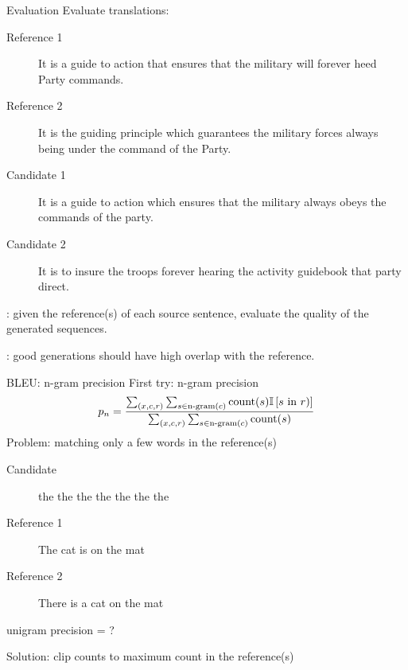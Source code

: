 \documentclass[usenames,dvipsnames,notes]{beamer}
\begin{document}
\begin{frame}
    {Evaluation}
    Evaluate translations:\\
    \begin{description}
        \item[Reference 1] It is a guide to action that ensures that the military will forever heed Party commands.
        \item[Reference 2] It is the guiding principle which guarantees the military forces always being under the command of the Party. 
        \item[Candidate 1] It is a guide to action which ensures that the military always obeys the commands of the party.
        \item[Candidate 2] It is to insure the troops forever hearing the activity guidebook that party direct.
    \end{description}

    : given the reference(s) of each source sentence, evaluate the quality of the generated sequences.

    : good generations should have high overlap with the reference.
\end{frame}

\begin{frame}
    {BLEU: n-gram precision}
    First try: n-gram precision
    $$
    p_n = \frac{
        \sum_{(x,c,r)} \sum_{s\in\text{n-gram}(c)} \text{count}(s)\mathbb{I}\left[ s \text{ in } r) \right]
    }
    {
\sum_{(x,c,r)} \sum_{s\in\text{n-gram}(c)} \text{count}(s)
    }
    $$
    Problem: matching only a few words in the reference(s)\\
    \begin{description}
        \item[Candidate] the the the the the the the
        \item[Reference 1] The cat is on the mat
        \item[Reference 2] There is a cat on the mat
    \end{description}
    unigram precision = ?

    Solution: clip counts to maximum count in the reference(s)
\end{frame}
\end{document}
